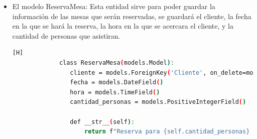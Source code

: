 \documentclass{article}
\begin{document}
\begin{itemize}
\begin{lstlisting}[language=bash,caption={Modelo de carrio}][H]
                def __str__(self):
                    return f"Carrito de {self.cliente.nombre}"
	  \end{lstlisting}
        \item El modelo ReservaMesa: Esta entidad sirve para poder guardar la información de las mesas que serán reservadas, se guardará el cliente, la fecha en la que se hará la reserva, la hora en la que se acercara el cliente, y la cantidad de personas que asistiran.
        \begin{lstlisting}[language=bash,caption={Modelo de ReservaMesa}][H]
		     class ReservaMesa(models.Model):
                cliente = models.ForeignKey('Cliente', on_delete=models.CASCADE)
                fecha = models.DateField()
                hora = models.TimeField()
                cantidad_personas = models.PositiveIntegerField()

                def __str__(self):
                    return f"Reserva para {self.cantidad_personas} personas el {self.fecha} a las {self.hora}"
	  \end{lstlisting}
  
	\end{itemize}
		
\end{document}
